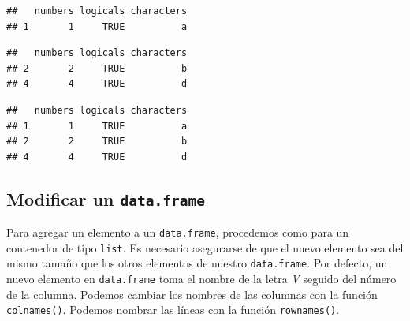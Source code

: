 \documentclass[]{book}
\newenvironment{Shaded}{\begin{snugshade}}{\end{snugshade}}
\newcommand{\KeywordTok}[1]{\textcolor[rgb]{0.13,0.29,0.53}{\textbf{#1}}}
\newcommand{\DecValTok}[1]{\textcolor[rgb]{0.00,0.00,0.81}{#1}}
\newcommand{\StringTok}[1]{\textcolor[rgb]{0.31,0.60,0.02}{#1}}
\newcommand{\OtherTok}[1]{\textcolor[rgb]{0.56,0.35,0.01}{#1}}
\newcommand{\OperatorTok}[1]{\textcolor[rgb]{0.81,0.36,0.00}{\textbf{#1}}}
\newcommand{\NormalTok}[1]{#1}
\begin{document}
\begin{verbatim}
##   numbers logicals characters
## 1       1     TRUE          a
\end{verbatim}

\begin{Shaded}
\end{Shaded}

\begin{verbatim}
##   numbers logicals characters
## 2       2     TRUE          b
## 4       4     TRUE          d
\end{verbatim}

\begin{Shaded}
\end{Shaded}

\begin{verbatim}
##   numbers logicals characters
## 1       1     TRUE          a
## 2       2     TRUE          b
## 4       4     TRUE          d
\end{verbatim}

\subsection{\texorpdfstring{Modificar un
\texttt{data.frame}}{Modificar un data.frame}}\label{modificar-un-data.frame}

Para agregar un elemento a un \texttt{data.frame}, procedemos como para
un contenedor de tipo \texttt{list}. Es necesario asegurarse de que el
nuevo elemento sea del mismo tamaño que los otros elementos de nuestro
\texttt{data.frame}. Por defecto, un nuevo elemento en
\texttt{data.frame} toma el nombre de la letra \emph{V} seguido del
número de la columna. Podemos cambiar los nombres de las columnas con la
función \texttt{colnames()}. Podemos nombrar las líneas con la función
\texttt{rownames()}.
\end{document}
